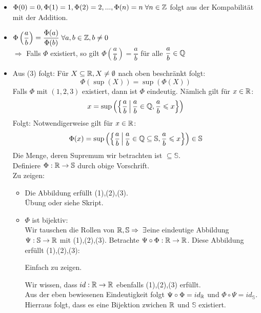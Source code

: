 \documentclass[main.tex]{subfiles}
\begin{document}
\begin{Beweis}
  \begin{itemize}
    \item $\Phi(0)=0,\Phi(1)=1,\Phi(2)=2,...,\Phi(n)=n \;\forall n \in \mathbb{Z}$ folgt aus der Kompabilität mit der Addition.
    \item $\Phi\left(\dfrac{a}{b}\right) = \dfrac{\Phi(a)}{\Phi(b)} \;\forall a,b \in \mathbb{Z}, b\neq 0$\\
    $\Rightarrow$ Falls $\Phi$ existiert, so gilt $\Phi\left(\dfrac{a}{b}\right) = \dfrac{a}{b}$ für alle $\dfrac{a}{b} \in \mathbb{Q}$
    \item Aus (3) folgt: Für $X\subseteq \mathbb{R} ,X \neq \emptyset$ nach oben beschränkt folgt:
    $$\Phi(\sup(X)) = \sup(\Phi(X))$$
    Falls $\Phi$ mit $(1,2,3)$ existiert, dann ist $\Phi$ eindeutig. Nämlich gilt für $x\in \mathbb{R}$:
    $$x = \sup\left(\left\{\dfrac{a}{b} \,\middle|\, \dfrac{a}{b}\in \mathbb{Q}, \dfrac{a}{b}\leqslant x\right\}\right)$$
    Folgt: Notwendigerweise gilt für $x \in \mathbb{R}$:
    $$\Phi(x) = \sup\left(\left\{\dfrac{a}{b} \,\middle|\, \dfrac{a}{b}\in \mathbb{Q} \subseteq \mathbb{S}, \dfrac{a}{b}\leqslant x\right\}\right) \in \mathbb{S}$$
    Die Menge, deren Supremum wir betrachten ist $\subseteq \mathbb{S}$.\\
    Definiere $\Phi: \mathbb{R} \to \mathbb{S}$ durch obige Vorschrift.\\
    Zu zeigen:\begin{itemize}
      \item Die Abbildung erfüllt (1),(2),(3).\\
      Übung oder siehe Skript.
      \item $\Phi$ ist bijektiv:\\
      Wir tauschen die Rollen von $\mathbb{R}, \mathbb{S} \Rightarrow \;\exists$eine eindeutige Abbildung $\Psi:\mathbb{S} \to \mathbb{R}$ mit (1),(2),(3).
      Betrachte $\Psi \circ \Phi: \mathbb{R} \to \mathbb{R}$. Diese Abbildung erfüllt (1),(2),(3):
      \begin{Bemerkung}
        Einfach zu zeigen.
      \end{Bemerkung}
      Wir wissen, dass $id: \mathbb{R} \to \mathbb{R}$ ebenfalls (1),(2),(3) erfüllt.\\
      Aus der eben bewiesenen Eindeutigkeit folgt $\Psi \circ \Phi = id_{\mathbb{R}}$ und $\Phi \circ \Psi = id_\mathbb{S}$.\\
      Hierraus folgt, dass es eine Bijektion zwichen $\mathbb{R}$ und $\mathbb{S}$ existiert.
    \end{itemize}
  \end{itemize}
\end{Beweis}
\end{document}
